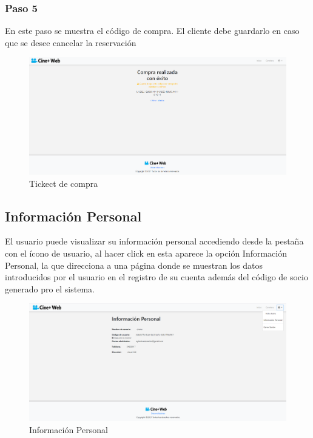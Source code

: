 \subsubsection{Paso 5}
En este paso se muestra el c\'odigo de compra. El cliente debe guardarlo en caso que se desee cancelar la reservaci\'on

\begin{figure}[h!]
	\centering
	\includegraphics[scale=0.35]{./chapters/img/ticketpurchase3.png}
	
	\label{fig:ticketpurchase3}
	\caption{Tickect de compra}
	
\end{figure}

\subsection{Informaci\'on Personal}
El usuario puede visualizar su informaci\'on personal accediendo desde la pesta\~na con el \'icono de usuario, al hacer click en esta aparece la opci\'on Informaci\'on Personal, la que direcciona a una p\'agina donde se muestran los datos introducidos por el usuario en el registro de su cuenta adem\'as del c\'odigo de socio generado pro el sistema.

\begin{figure}[h!]
	\centering
	\includegraphics[scale=0.35]{./chapters/img/personal_info.png}
	
	\label{fig:personal_info}
	\caption{Informaci\'on Personal}
	
\end{figure}
